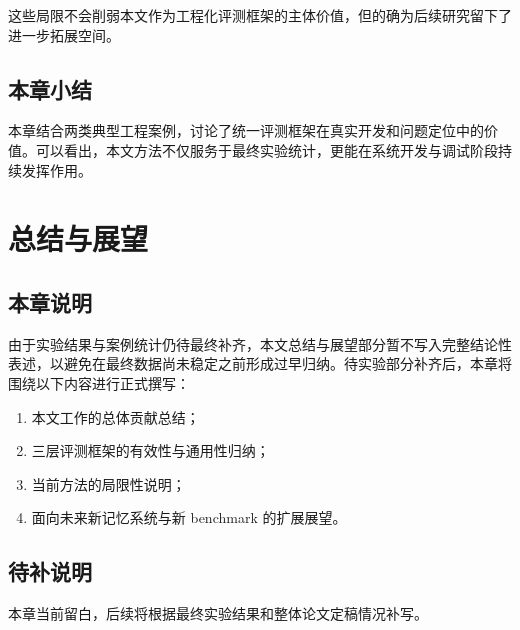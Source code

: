 这些局限不会削弱本文作为工程化评测框架的主体价值，但的确为后续研究留下了进一步拓展空间。

\section{本章小结}

本章结合两类典型工程案例，讨论了统一评测框架在真实开发和问题定位中的价值。可以看出，本文方法不仅服务于最终实验统计，更能在系统开发与调试阶段持续发挥作用。

\chapter{总结与展望}

\section{本章说明}

由于实验结果与案例统计仍待最终补齐，本文总结与展望部分暂不写入完整结论性表述，以避免在最终数据尚未稳定之前形成过早归纳。待实验部分补齐后，本章将围绕以下内容进行正式撰写：

\begin{enumerate}
    \item 本文工作的总体贡献总结；
    \item 三层评测框架的有效性与通用性归纳；
    \item 当前方法的局限性说明；
    \item 面向未来新记忆系统与新 benchmark 的扩展展望。
\end{enumerate}

\section{待补说明}

本章当前留白，后续将根据最终实验结果和整体论文定稿情况补写。
